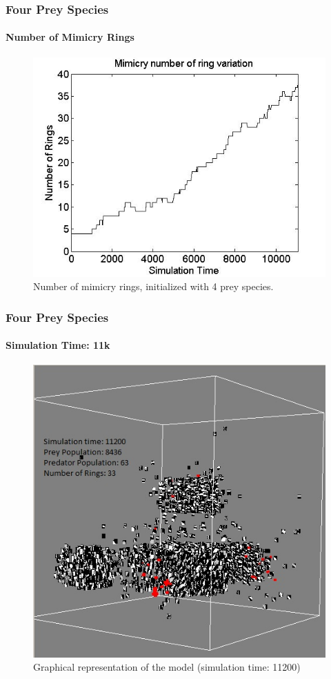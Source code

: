 \frame
{
	\frametitle{Four Prey Species}
	\framesubtitle{Number of Mimicry Rings}

	\begin{figure}
		\centering
		\includegraphics[scale=0.30]{../tex/images/ringSize10k-4Prey}
		\caption{Number of mimicry rings, initialized with 4 prey species.}
		\label{fig:ringSize10k-4Prey}
	\end{figure}
}

\frame
{
	\frametitle{Four Prey Species}
	\framesubtitle{Simulation Time: 11k}

	\begin{figure}[H]
		\centering
		\label{fig:screenshot-simTime11K-4Prey}
		\includegraphics[scale=0.4]{../tex/images/simTime11K-4Prey}
		\caption{Graphical representation of the model (simulation time: 11200)}
	\end{figure}
}

